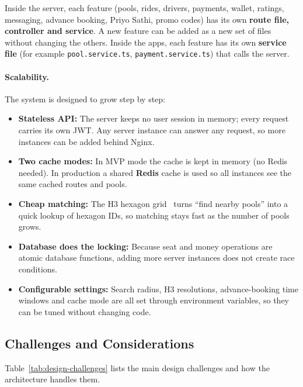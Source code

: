 Inside the server, each feature (pools, rides, drivers, payments, wallet,
ratings, messaging, advance booking, Priyo Sathi, promo codes) has its own
\textbf{route file, controller and service}. A new feature can be added as a
new set of files without changing the others. Inside the apps, each feature has
its own \textbf{service file} (for example \texttt{pool.service.ts},
\texttt{payment.service.ts}) that calls the server.

\paragraph{Scalability.}
The system is designed to grow step by step:

\begin{itemize}
  \item \textbf{Stateless API:} The server keeps no user session in memory;
        every request carries its own JWT. Any server instance can answer any
        request, so more instances can be added behind Nginx.
  \item \textbf{Two cache modes:} In MVP mode the cache is kept in memory (no
        Redis needed). In production a shared \textbf{Redis} cache is used so
        all instances see the same cached routes and pools.
  \item \textbf{Cheap matching:} The H3 hexagon grid~\cite{h3} turns ``find
        nearby pools'' into a quick lookup of hexagon IDs, so matching stays
        fast as the number of pools grows.
  \item \textbf{Database does the locking:} Because seat and money operations
        are atomic database functions, adding more server instances does not
        create race conditions.
  \item \textbf{Configurable settings:} Search radius, H3 resolutions,
        advance-booking time windows and cache mode are all set through
        environment variables, so they can be tuned without changing code.
\end{itemize}

\subsection{Challenges and Considerations}
\label{subsec:arch-challenges}

Table~\ref{tab:design-challenges} lists the main design challenges and how the
architecture handles them.

